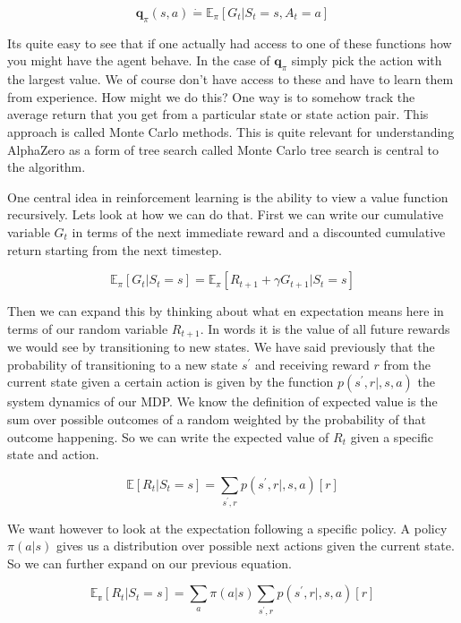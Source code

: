 \begin{equation}\label{Expected State Action Value}
\mathbf{q}_{\pi}(s,a) \dot{=} \mathbb{E}_{\pi}[G_{t} | S_{t} = s, A_{t} = a] 
\end{equation}

Its quite easy to see that if one actually had access to one of these functions how you might have the agent behave. In the case of $\mathbf{q}_{\pi}$ simply pick the action with the largest value. We of course don't have access to these and have to learn them from experience. How might we do this? One way is to somehow track the average return that you get from a particular state or state action pair. This approach is called Monte Carlo methods. This is quite relevant for understanding AlphaZero as a form of tree search called Monte Carlo tree search is central to the algorithm. 
    
One central idea in reinforcement learning is the ability to view a value function recursively. Lets look at how we can do that. First we can write our cumulative variable $G_{t}$ in terms of the next immediate reward and a discounted cumulative return starting from the next timestep.  

    $$ \mathbb{E}_{\pi}[G_{t} | S_{t} = s] = \mathbb{E}_{\pi}[R_{t + 1} + \gamma G_{t + 1} | S_{t} = s] $$
    
Then we can expand this by thinking about what en expectation means here in terms of our random variable $R_{t + 1}$. In words it is the value of all future rewards we would see by transitioning to new states. We have said previously that the probability of transitioning to a new state $s^{'}$ and receiving reward $r$ from the current state given a certain action is given by the function $p(s^{'},r|,s,a)$ the system dynamics of our MDP. We know the definition of expected value is the sum over possible outcomes of a random weighted by the probability of that outcome happening. So we can write the expected value of $R_{t}$ given a specific state and action. 

$$ \mathbb{E}[R_{t} | S_{t} = s] = \underset{s^{'},r}{\sum}p(s^{'},r|,s,a)[ r ]$$

We want however to look at the expectation following a specific policy. A policy $\pi(a|s)$ gives us a distribution over possible next actions given the current state. So we can further expand on our previous equation. 

$$ \mathbb{E_{\pi}}[R_{t} | S_{t} = s] = \underset{a}{\sum}\pi(a|s)\underset{s^{'},r}{\sum}p(s^{'},r|,s,a)[ r ]$$

